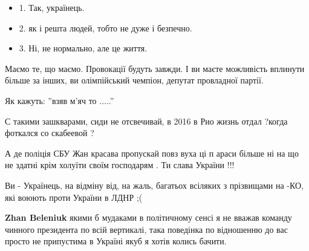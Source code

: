 \begin{itemize}
\begin{itemize}
  \item 1. Так, українець.
  \item 2. як і решта людей, тобто не дуже і безпечно.
  \item 3. Ні, не нормально, але це життя.
\end{itemize}

Маємо те, що маємо. Провокації будуть завжди. І ви маєте можливість вплинути
більше за інших, ви олімпійський чемпіон, депутат провладної партії.

Як кажуть: ''взяв м'яч то .....''

 

С такими зашкварами, сиди не отсвечивай, в 2016 в Рио жизнь отдал ?когда фоткался со скабеевой ?


 

А де поліція СБУ Жан красава пропускай повз вуха ці п араси більше ні на що не
здатні крім холуїти своїм господарям . Ти слава України !!!


 

Ви - Українець, на відміну від, на жаль, багатьох всіляких з прізвищами на -КО,
які воюють проти України в ЛДНР ;(

 
\textbf{Zhan Beleniuk} якими б мудаками в політичному сенсі я не вважав команду
чинного президента по всій вертикалі, така поведінка по відношенню до вас
просто не припустима в Україні якуб я хотів колись бачити.


\end{itemize}
